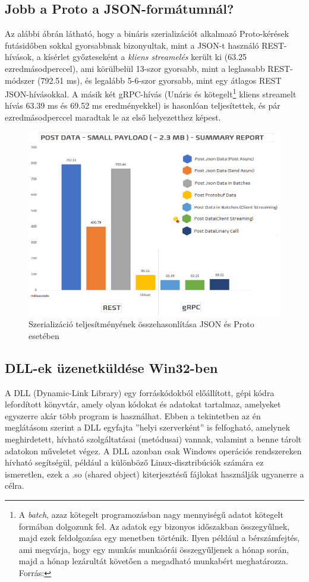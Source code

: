 \documentclass[tocnopagenum]{thesis-ekf}
\begin{document}
	\subsection{Jobb a Proto a JSON-formátumnál?}
	\label{grpc_json}
	Az alábbi ábrán látható, hogy a bináris szerializációt alkalmazó Proto-kérések futásidőben sokkal gyorsabbnak bizonyultak, mint a JSON-t használó REST-hívások, a kísérlet győzteseként a \textit{kliens streamelés} került ki (63.25 ezredmásodperccel), ami körülbelül 13-szor gyorsabb, mint a leglassabb REST-módszer (792.51 ms), és legalább 5-6-szor gyorsabb, mint egy átlagos REST JSON-hívásokkal. A másik két gRPC-hívás (Unáris és kötegelt\footnote{A \textit{batch}, azaz kötegelt programozásban nagy mennyiségű adatot kötegelt formában dolgozunk fel. Az adatok egy bizonyos időszakban összegyűlnek, majd ezek feldolgozása egy menetben történik. Ilyen például a bérszámfejtés, ami megvárja, hogy egy munkás munkaórái összegyűljenek a hónap során, majd a hónap lezárultát követően a megadható munkabért meghatározza. Forrás:\cite{batch}} kliens streamelt hívás 63.39 ms és 69.52 ms eredményekkel) is hasonlóan teljesítettek, és pár ezredmásodperccel maradtak le az első helyezetthez képest.
	\cite{grpc_performance}
	\begin{figure}[h!]
		\centering
		\includegraphics[scale=0.2]{grpc_json}
		\caption{Szerializáció teljesítményének összehasonlítása JSON és Proto esetében}
		\label{fig:grpc_json}
	\end{figure}

	\subsection{DLL-ek üzenetküldése Win32-ben}
	A DLL (Dynamic-Link Library) egy forráskódokból előállított, gépi kódra lefordított könyvtár, amely olyan kódokat és adatokat tartalmaz, amelyeket egyszerre akár több program is használhat. Ebben a tekintetben az én meglátásom szerint a DLL egyfajta ''helyi szerverként'' is felfogható, amelynek meghirdetett, hívható szolgáltatásai (metódusai) vannak, valamint a benne tárolt adatokon műveletet végez. A DLL azonban csak Windows operációs rendszereken hívható segítségül, például a különböző Linux-disztribúciók számára ez ismeretlen, ezek a .so (shared object) kiterjesztésű fájlokat használják ugyanerre a célra.
	
\end{document}
